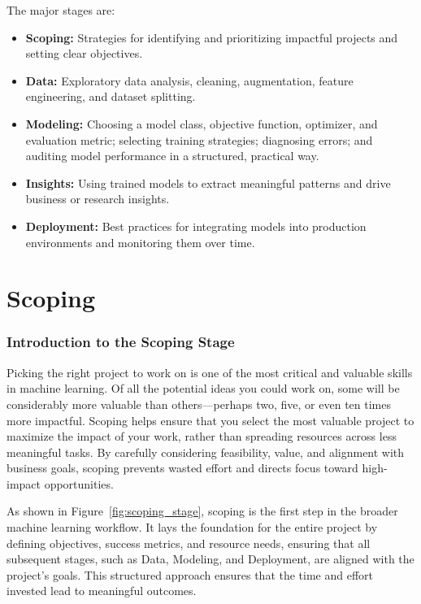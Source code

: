 \documentclass[12pt,openany]{book}
\begin{document}
The major stages are:

\begin{itemize}
    \item \textbf{Scoping:} Strategies for identifying and prioritizing impactful projects and setting clear objectives.
    \item \textbf{Data:} Exploratory data analysis, cleaning, augmentation, feature engineering, and dataset splitting.
    \item \textbf{Modeling:} Choosing a model class, objective function, optimizer, and evaluation metric; selecting training strategies; diagnosing errors; and auditing model performance in a structured, practical way.
    \item \textbf{Insights:} Using trained models to extract meaningful patterns and drive business or research insights.
    \item \textbf{Deployment:} Best practices for integrating models into production environments and monitoring them over time.
\end{itemize}





\part{Scoping}



\section*{Introduction to the Scoping Stage}

Picking the right project to work on is one of the most critical and valuable skills in machine learning. Of all the potential ideas you could work on, some will be considerably more valuable than others—perhaps two, five, or even ten times more impactful. Scoping helps ensure that you select the most valuable project to maximize the impact of your work, rather than spreading resources across less meaningful tasks. By carefully considering feasibility, value, and alignment with business goals, scoping prevents wasted effort and directs focus toward high-impact opportunities. \newline

As shown in Figure~\ref{fig:scoping_stage}, scoping is the first step in the broader machine learning workflow. It lays the foundation for the entire project by defining objectives, success metrics, and resource needs, ensuring that all subsequent stages, such as Data, Modeling, and Deployment, are aligned with the project’s goals. This structured approach ensures that the time and effort invested lead to meaningful outcomes.
\end{document}
